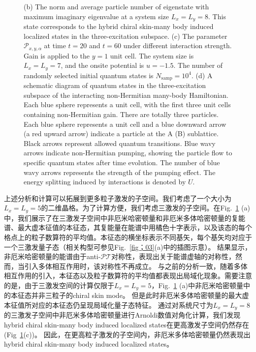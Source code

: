 \documentclass[longbibliography, aps, prx, amsmath, amssymb, amsfonts, twocolumn,superscriptaddress, footinbib]{revtex4-1}
\begin{document}
\begin{figure}[htbp]
{		(b) The norm and average particle number of eigenstate with maximum imaginary eigenvalue at a system size $L_x=L_y=8$. This state corresponds to the hybrid chiral skin-many body induced localized states in the three-excitation subspace.
		(c) The parameter $\mathcal{P}_{x,y,\alpha}$ at time $t=20$ and $t=60$ under different interaction strength. Gain is applied to the $y=1$ unit cell. The system size is $L_x=L_y=7$, and the onsite potential is $u=-1.5$. The number of randomly selected initial quantum states is $N_{\text{samp}}=10^4$. 
		(d)  A schematic diagram of quantum states in the three-excitation subspace of the interacting non-Hermitian many-body Hamiltonian. Each blue sphere represents a unit cell, with the first three unit cells containing non-Hermitian gain. There are totally three particles.
		Each blue sphere represents a unit cell and a blue downward arrow (a red upward arrow) indicate a particle at the A (B) sublattice. Black arrows represent allowed quantum transitions. Blue wavy arrows indicate non-Hermitian pumping, showing the particle flow to specific quantum states after time evolution. The number of blue wavy arrows represents the strength of the pumping effect. The energy splitting induced by interactions is denoted by $U$.
		}
		\label{fig:03}
	\end{figure}
	
	上述分析和计算可以拓展到更多粒子激发的子空间。我们考虑了一个大小为$L_x=L_y=5$的二维晶格。为了计算方便，我们考虑三激发的子空间。在Fig.~\ref{fig:03} (a)中，我们展示了在三激发子空间中非厄米哈密顿量和非厄米多体哈密顿量的复能谱、最大虚本征值的本征态，其复能量在能谱中用橘色十字表示，以及该态的每个格点上的粒子数算符的平均值。本征态的横坐标表示不同基矢，每个基矢均对应于一个三激发量子态（相关构型可参见Fig.~\ref{fig；03}(a)中的插图示意）。
	结果显示，非厄米哈密顿量的能谱由于anti-$\mathcal{PT}$对称性，表现出关于能谱虚轴的对称性，然而，当引入多体相互作用时，该对称性不再成立。
	与之前的分析一致，随着多体相互作用的引入，本征态以及粒子数算符的平均值都表现出局域化现象。需要注意的是，由于三激发空间的计算仅限于$L_x=L_y=5$，Fig.~\ref{fig:03} (a)中非厄米哈密顿量中的本征态并非三粒子的chiral skin mode。
	但是此时非厄米多体哈密顿量的最大虚本征值所对应的本征态仍呈现局域化量子态特征。
	通过对系统尺寸为$L_x=L_y=8$的三激发子空间中非厄米多体哈密顿量进行Arnoldi数值对角化计算，我们发现hybrid chiral skin-many body induced localized states在更高激发子空间仍然存在(Fig~\ref{fig:03}(c))。
	因此，在更高粒子激发的子空间内，非厄米多体哈密顿量仍然表现出hybrid chiral skin-many body induced localized states。
\end{document}
